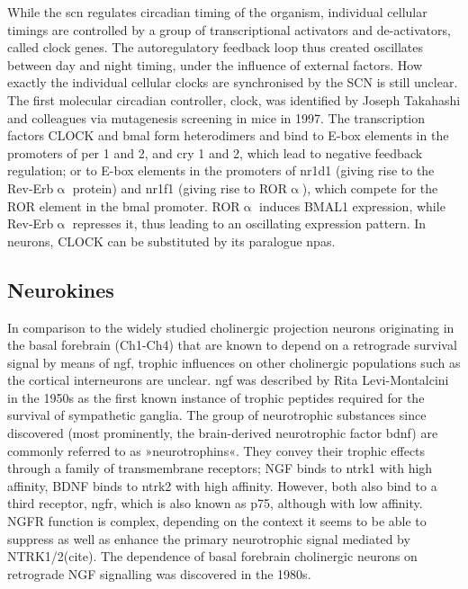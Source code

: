 While the \ac{scn} regulates circadian timing of the organism, individual cellular timings are controlled by a group of transcriptional activators and de-activators, called clock genes. The autoregulatory feedback loop thus created oscillates between day and night timing, under the influence of external factors. How exactly the individual cellular clocks are synchronised by the SCN is still unclear.\cite{Balsalobre2002} The first molecular circadian controller, \ac{clock}, was identified by Joseph Takahashi and colleagues via mutagenesis screening in mice in 1997.\cite{King1997} The transcription factors CLOCK and \ac{bmal} form heterodimers and bind to E-box elements in the promoters of \ac{per} 1 and 2, and \ac{cry} 1 and 2, which lead to negative feedback regulation; or to E-box elements in the promoters of \acs{nr1d1} (giving rise to the Rev-Erb$\upalpha$ protein) and \acs{nr1f1} (giving rise to ROR$\upalpha$), which compete for the ROR element in the \ac{bmal} promoter. ROR$\upalpha$ induces BMAL1 expression, while Rev-Erb$\upalpha$ represses it, thus leading to an oscillating expression pattern. In neurons, CLOCK can be substituted by its paralogue \acs{npas}.

\subsection{Neurokines} \label{sec:intro:neurokine}
In comparison to the widely studied cholinergic projection neurons originating in the basal forebrain (Ch1-Ch4) that are known to depend on a retrograde survival signal by means of \ac{ngf}, trophic influences on other cholinergic populations such as the cortical interneurons are unclear.  \ac{ngf} was described by Rita Levi-Montalcini in the 1950s as the first known instance of trophic peptides required for the survival of sympathetic ganglia.\cite{Levi-Montalcini1960} The group of neurotrophic substances since discovered (most prominently, the brain-derived neurotrophic factor \acs{bdnf}) are commonly referred to as »neurotrophins«. They convey their trophic effects through a family of transmembrane receptors; NGF binds to \ac{ntrk1} with high affinity, BDNF binds to \ac{ntrk2} with high affinity. However, both also bind to a third receptor, \ac{ngfr}, which is also known as p75, although with low affinity. NGFR function is complex, depending on the context it seems to be able to suppress as well as enhance the primary neurotrophic signal mediated by NTRK1/2(cite). The dependence of basal forebrain cholinergic neurons on retrograde NGF signalling was discovered in the 1980s.\cite{Hefti1986}

